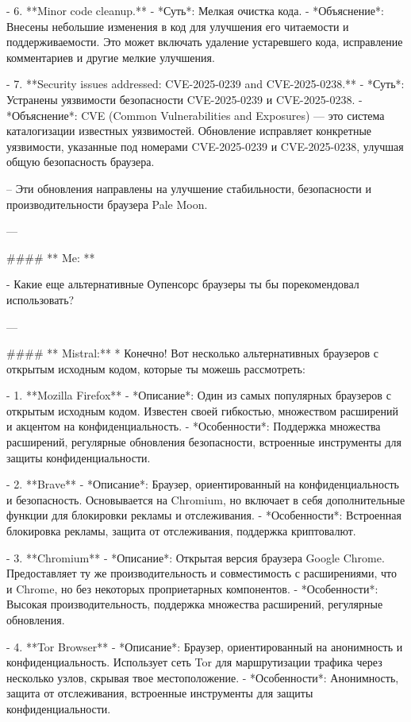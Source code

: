-  6. **Minor code cleanup.**
   - *Суть*: Мелкая очистка кода.
   - *Объяснение*: Внесены небольшие изменения в код для улучшения его читаемости и поддерживаемости. Это может включать удаление устаревшего кода, исправление комментариев и другие мелкие улучшения.

-  7. **Security issues addressed: CVE-2025-0239 and CVE-2025-0238.**
   - *Суть*: Устранены уязвимости безопасности CVE-2025-0239 и CVE-2025-0238.
   - *Объяснение*: CVE (Common Vulnerabilities and Exposures) — это система каталогизации известных уязвимостей. Обновление исправляет конкретные уязвимости, указанные под номерами CVE-2025-0239 и CVE-2025-0238, улучшая общую безопасность браузера.

--  Эти обновления направлены на улучшение стабильности, безопасности и производительности браузера Pale Moon.

---

#### **  Me:  **

- 
Какие еще альтернативные Оупенсорс браузеры ты бы порекомендовал использовать?


---



#### ** Mistral:**
* 
Конечно! Вот несколько альтернативных браузеров с открытым исходным кодом, которые ты можешь рассмотреть:

-  1. **Mozilla Firefox**
   - *Описание*: Один из самых популярных браузеров с открытым исходным кодом. Известен своей гибкостью, множеством расширений и акцентом на конфиденциальность.
   - *Особенности*: Поддержка множества расширений, регулярные обновления безопасности, встроенные инструменты для защиты конфиденциальности.

-  2. **Brave**
   - *Описание*: Браузер, ориентированный на конфиденциальность и безопасность. Основывается на Chromium, но включает в себя дополнительные функции для блокировки рекламы и отслеживания.
   - *Особенности*: Встроенная блокировка рекламы, защита от отслеживания, поддержка криптовалют.

-  3. **Chromium**
   - *Описание*: Открытая версия браузера Google Chrome. Предоставляет ту же производительность и совместимость с расширениями, что и Chrome, но без некоторых проприетарных компонентов.
   - *Особенности*: Высокая производительность, поддержка множества расширений, регулярные обновления.

-  4. **Tor Browser**
   - *Описание*: Браузер, ориентированный на анонимность и конфиденциальность. Использует сеть Tor для маршрутизации трафика через несколько узлов, скрывая твое местоположение.
   - *Особенности*: Анонимность, защита от отслеживания, встроенные инструменты для защиты конфиденциальности.

